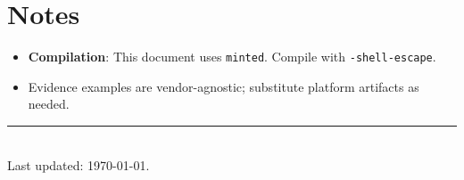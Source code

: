 \documentclass[11pt]{article}
\begin{document}
\section*{Notes}
\begin{itemize}
  \item \textbf{Compilation}: This document uses \texttt{minted}. Compile with \texttt{-shell-escape}.
  \item Evidence examples are vendor-agnostic; substitute platform artifacts as needed.
\end{itemize}

\vspace{0.5em}
\noindent\rule{\linewidth}{0.4pt}\\
{\footnotesize Last updated: \today.}
\end{document}
